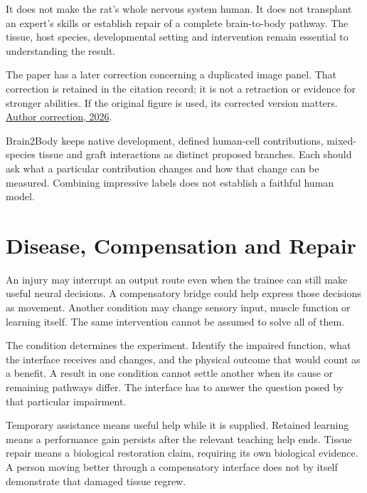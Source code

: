 It does not make the rat's whole nervous system human. It does not transplant an expert's skills or establish repair of a complete brain-to-body pathway. The tissue, host species, developmental setting and intervention remain essential to understanding the result.\par

The paper has a later correction concerning a duplicated image panel. That correction is retained in the citation record; it is not a retraction or evidence for stronger abilities. If the original figure is used, its corrected version matters. \href{https://www.nature.com/articles/s41586-026-10943-4}{Author correction, 2026}.\par

Brain2Body keeps native development, defined human-cell contributions, mixed-species tissue and graft interactions as distinct proposed branches. Each should ask what a particular contribution changes and how that change can be measured. Combining impressive labels does not establish a faithful human model.\par

\section{Disease, Compensation and Repair}

An injury may interrupt an output route even when the trainee can still make useful neural decisions. A compensatory bridge could help express those decisions as movement. Another condition may change sensory input, muscle function or learning itself. The same intervention cannot be assumed to solve all of them.\par

The condition determines the experiment. Identify the impaired function, what the interface receives and changes, and the physical outcome that would count as a benefit. A result in one condition cannot settle another when its cause or remaining pathways differ. The interface has to answer the question posed by that particular impairment.\par

Temporary assistance means useful help while it is supplied. Retained learning means a performance gain persists after the relevant teaching help ends. Tissue repair means a biological restoration claim, requiring its own biological evidence. A person moving better through a compensatory interface does not by itself demonstrate that damaged tissue regrew.\par

